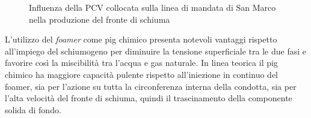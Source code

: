 \begin{figure}[htbp]
    \centering
     \qquad
\caption{Influenza della PCV collocata sulla linea di mandata di San Marco nella produzione del fronte di schiuma}
\label{fig:generazione-foam}
\end{figure}
L'utilizzo del \textit{foamer} come pig chimico presenta notevoli vantaggi rispetto all'impiego del schiumogeno per diminuire la tensione superficiale tra le due fasi e favorire così la miscibilità tra l'acqua e gas naturale. In linea teorica il pig chimico ha maggiore capacità pulente rispetto all'iniezione in continuo del foamer, sia per l'azione su tutta la circonferenza interna della condotta, sia per l'alta velocità del fronte di schiuma, quindi il trascinamento della componente solida di fondo.\\


